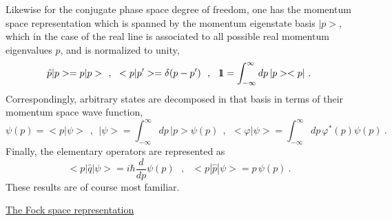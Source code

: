 \documentclass[a4paper,11pt]{article}
\def\one{1\hskip -.37em 1}
\begin{document}
Likewise for the conjugate phase space degree of freedom, one has
the momentum space representation which is spanned by the momentum
eigenstate basis $|p>$, which in the case of the real line is associated
to all possible real momentum eigenvalues $p$, and is normalized to unity,
\begin{equation}
\hat{p}|p>=p|p>\ \ ,\ \ <p|p'>=\delta(p-p')\ \ ,\ \ 
\one=\int_{-\infty}^\infty dp\,|p><p|\ .
\end{equation}
Correspondingly, arbitrary states are decomposed in that basis in terms
of their momentum space wave function,
\begin{equation}
\psi(p)=<p|\psi>\ \ ,\ \ 
|\psi>=\int_{-\infty}^\infty dp\,|p>\psi(p)\ \ ,\ \ 
<\varphi|\psi>=\int_{-\infty}^\infty dp\,\varphi^*(p)\psi(p)\ .
\end{equation}
Finally, the elementary operators are represented as
\begin{equation}
<p|\hat{q}|\psi>=i\hbar\frac{d}{dp}\psi(p)\ \ \ ,\ \ \
<p|\hat{p}|\psi>=p\,\psi(p)\ .
\end{equation}
These results are of course most familiar.

\vspace{10pt}

\noindent\underline{The Fock space representation}

\vspace{5pt}
\end{document}
